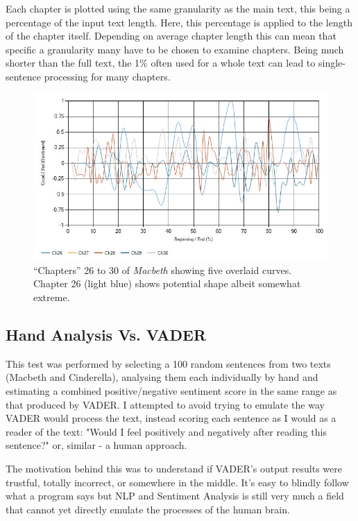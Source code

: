 \documentclass{article}
\begin{document}
            Each chapter is plotted using the same granularity as the main text, this being a percentage of the input text length. Here, this percentage is applied to the length of the chapter itself. Depending on average chapter length this can mean that specific a granularity many have to be chosen to examine chapters. Being much shorter than the full text, the 1\% often used for a whole text can lead to single-sentence processing for many chapters.
            \begin{figure}
                \includegraphics[width=1\textwidth]{Figures/Chap/Macbeth}
                \centering
                \caption{``Chapters'' 26 to 30 of \textit{Macbeth} showing five overlaid curves. Chapter 26 (light blue) shows potential shape albeit somewhat extreme.} 
                \label{fig:handMacbeth}
            \end{figure}
    \subsection{Hand Analysis Vs. VADER}
        This test was performed by selecting a 100 random sentences from two texts (Macbeth and Cinderella), analysing them each individually by hand and estimating a combined positive/negative sentiment score in the same range as that produced by VADER. I attempted to avoid trying to emulate the way VADER would process the text, instead scoring each sentence as I would as a reader of the text: "Would I feel positively and negatively after reading this sentence?" or, similar - a human approach.
        
        The motivation behind this was to understand if VADER's output results were trustful, totally incorrect, or somewhere in the middle. It's easy to blindly follow what a program says but NLP and Sentiment Analysis is still very much a field that cannot yet directly emulate the processes of the human brain.
    
\end{document}
